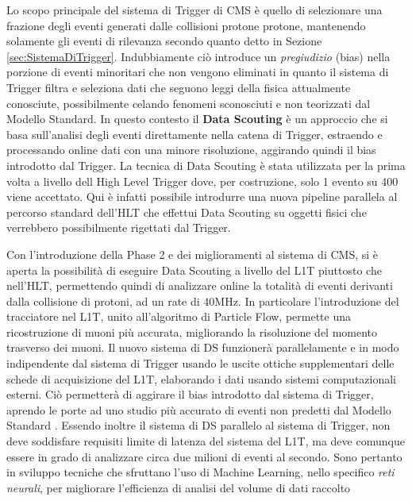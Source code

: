 Lo scopo principale del sistema di Trigger di CMS è quello di selezionare una frazione degli eventi generati dalle collisioni protone protone, mantenendo solamente gli eventi di rilevanza secondo quanto detto in Sezione \ref{sec:SistemaDiTrigger}. Indubbiamente ciò introduce un \textit{pregiudizio} (bias) nella porzione di eventi minoritari che non vengono eliminati in quanto il sistema di Trigger filtra e seleziona dati che seguono leggi della fisica attualmente conosciute, possibilmente celando fenomeni sconosciuti e non teorizzati dal Modello Standard. \newline
In questo contesto il \textbf{Data Scouting} è un approccio che si basa sull'analisi degli eventi direttamente nella catena di Trigger, estraendo e processando online dati con una minore risoluzione, aggirando quindi il bias introdotto dal Trigger. \newline
La tecnica di Data Scouting è stata utilizzata per la prima volta a livello dell High Level Trigger dove, per costruzione, solo 1 evento su 400 viene accettato. Qui è infatti possibile introdurre una nuova pipeline parallela al percorso standard dell'HLT che effettui Data Scouting su oggetti fisici che verrebbero possibilmente rigettati dal Trigger.

Con l'introduzione della Phase 2 e dei miglioramenti al sistema di CMS, si è aperta la possibilità di eseguire Data Scouting a livello del L1T piuttosto che nell'HLT, permettendo quindi di analizzare online la totalità di eventi derivanti dalla collisione di protoni, ad un rate di 40MHz. In particolare l'introduzione del tracciatore nel L1T, unito all'algoritmo di Particle Flow, permette una ricostruzione di muoni più accurata, migliorando la risoluzione del momento trasverso dei muoni. Il nuovo sistema di DS funzionerà parallelamente e in modo indipendente dal sistema di Trigger usando le uscite ottiche supplementari delle schede di acquisizione del L1T, elaborando i dati usando sistemi computazionali esterni. Ciò permetterà di aggirare il bias introdotto dal sistema di Trigger, aprendo le porte ad uno studio più accurato di eventi non predetti dal Modello Standard \cite{MasterThesisNicLai}. Essendo inoltre il sistema di DS parallelo al sistema di Trigger, non deve soddisfare requisiti limite di latenza del sistema del L1T, ma deve comunque essere in grado di analizzare circa due milioni di eventi al secondo. Sono pertanto in sviluppo tecniche che sfruttano l'uso di Machine Learning, nello specifico \textit{reti neurali}, per migliorare l'efficienza di analisi del volume di dati raccolto \cite{MasterThesisNicLai}

